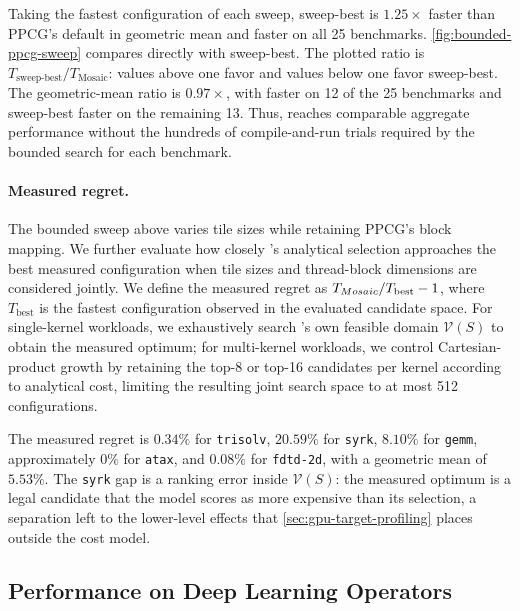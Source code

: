 Taking the fastest configuration of each sweep, sweep-best is $1.25\times$ faster than PPCG's default in geometric mean and faster on all 25 benchmarks. \autoref{fig:bounded-ppcg-sweep} compares \name directly with sweep-best. The plotted ratio is \(T_{\mathrm{sweep\text{-}best}} / T_{\mathrm{Mosaic}}\): values above one favor \name and values below one favor sweep-best. The geometric-mean ratio is $0.97\times$, with \name faster on 12 of the 25 benchmarks and sweep-best faster on the remaining 13. Thus, \name reaches comparable aggregate performance without the hundreds of compile-and-run trials required by the bounded search for each benchmark.

\paragraph{Measured regret.}
The bounded sweep above varies tile sizes while retaining PPCG's block
mapping. We further evaluate how closely \name's analytical selection
approaches the best measured configuration when tile sizes and thread-block
dimensions are considered jointly. We define the measured regret as
\(T_{{Mosaic}}/T_{\mathrm{best}}-1\), where \(T_{\mathrm{best}}\) is the fastest
configuration observed in the evaluated candidate space. For single-kernel
workloads, we exhaustively search \name's own feasible domain \(\mathcal{V}(S)\)
to obtain the measured optimum; for multi-kernel
workloads, we control Cartesian-product growth by retaining the top-8 or
top-16 candidates per kernel according to analytical cost, limiting the
resulting joint search space to at most 512 configurations.

The measured regret is \(0.34\%\) for \texttt{trisolv}, \(20.59\%\) for
\texttt{syrk}, \(8.10\%\) for \texttt{gemm}, approximately \(0\%\) for
\texttt{atax}, and \(0.08\%\) for \texttt{fdtd-2d}, with a geometric mean
of \(5.53\%\). The \texttt{syrk} gap is a ranking error inside \(\mathcal{V}(S)\): the measured
optimum is a legal candidate that the model scores as more expensive than its
selection, a separation left to the lower-level effects that
\autoref{sec:gpu-target-profiling} places outside the cost model.

\FloatBarrier
\subsection{Performance on Deep Learning Operators}
\label{subsec:operators}

